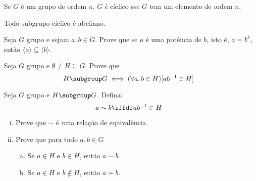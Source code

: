 \begin{exercise}
Se $G$ é um grupo de ordem $n$, $G$ é cíclico sse $G$ tem um elemento de ordem $n$.
\end{exercise}

\begin{exercise}
Todo subgrupo cíclico é abeliano.
\end{exercise}

\begin{exercise}
Seja $G$ grupo e sejam $a,b \in G$. Prove que se $a$ é uma potência de $b$, isto é, $a = b^k$, então $\langle a \rangle \subseteq \langle b \rangle$.
\end{exercise}

\begin{exercise}
Seja $G$ grupo e $\emptyset \not = H \subseteq G$. Prove que
$$
    H \subgroup G \iff (\forall a,b \in H)[ab^{-1} \in H]
$$
\end{exercise}

\begin{exercise}
Seja $G$ grupo e $H \subgroup G$. Defina:
$$
    a \sim b \iffdf ab^{-1} \in H
$$
\begin{enumerate}[(i)]
    \item Prove que $\sim$ é uma relação de equivalência.
    \item Prove que para todo $a,b \in G$
        \begin{enumerate}[(a)]
            \item Se $a \in H$ e $b \in H$, então $a \sim b$.
            \item Se $a \in H$ e $b \not \in H$, então $a \not \sim b$.
        \end{enumerate}
\end{enumerate}
\end{exercise}
